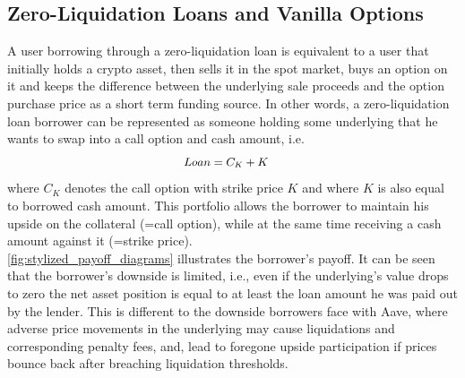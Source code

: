 \documentclass[a4paper]{article}
\begin{document}
\subsection{Zero-Liquidation Loans and Vanilla Options}
\label{sec:zero_liquididation_loans_and_vanilla_options}
A user borrowing through a zero-liquidation loan is equivalent to a user that initially holds a crypto asset, then sells it in the spot market, buys an option on it and keeps the difference between the underlying sale proceeds and the option purchase price as a short term funding source. In other words, a zero-liquidation loan borrower can be represented as someone holding some underlying that he wants to swap into a call option and cash amount, i.e.
\begin{equation}
\small
\begin{split}
Loan &= C_K+K
\end{split}
\end{equation}
where $C_K$ denotes the call option with strike price $K$ and where $K$ is also equal to borrowed cash amount. This portfolio allows the borrower to maintain his upside on the collateral (=call option), while at the same time receiving a cash amount against it (=strike price).\\ 

\cref{fig:stylized_payoff_diagrams} illustrates the borrower's payoff. It can be seen that the borrower's downside is limited, i.e., even if the underlying's value drops to zero the net asset position is equal to at least the loan amount he was paid out by the lender. This is different to the downside borrowers face with Aave, where adverse price movements in the underlying may cause liquidations and corresponding penalty fees, and, lead to foregone upside participation if prices bounce back after breaching liquidation thresholds.\\

\end{document}
